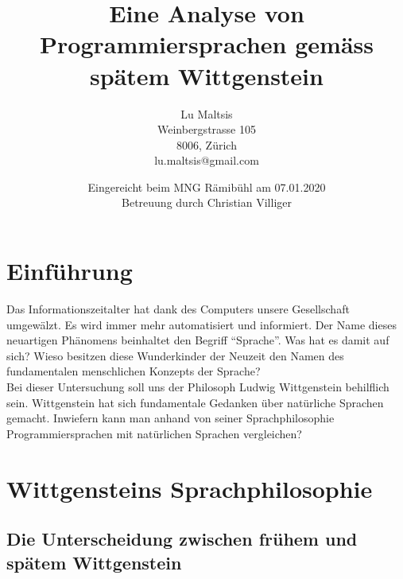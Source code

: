 \documentclass[10pt,a4paper]{article}
\begin{document}
\setcounter{page}{0}


\title{\Large{\textbf{Eine Analyse von Programmiersprachen gemäss spätem Wittgenstein}}}
\author{Lu Maltsis \\
Weinbergstrasse 105 \\
8006, Zürich \\
lu.maltsis@gmail.com \\
}
\date{Eingereicht beim MNG Rämibühl am 07.01.2020 \\
\vspace{10mm}
Betreuung durch Christian Villiger}
\maketitle
\newpage


\setcounter{section}{-1}
\enlargethispage{\baselineskip}
\tableofcontents{}

\section{Einführung}
Das Informationszeitalter hat dank des Computers unsere Gesellschaft umgewälzt. Es wird immer mehr automatisiert und informiert. Der Name dieses neuartigen Phänomens beinhaltet den Begriff \enquote{Sprache}. Was hat es damit auf sich? Wieso besitzen diese Wunderkinder der Neuzeit den Namen des fundamentalen menschlichen Konzepts der Sprache? \\
Bei dieser Untersuchung soll uns der Philosoph Ludwig Wittgenstein behilflich sein. Wittgenstein hat sich fundamentale Gedanken über natürliche Sprachen gemacht. Inwiefern kann man anhand von seiner Sprachphilosophie Programmiersprachen mit natürlichen Sprachen vergleichen?


\section{Wittgensteins Sprachphilosophie}

\subsection{Die Unterscheidung zwischen frühem und spätem Wittgenstein}
\end{document}
